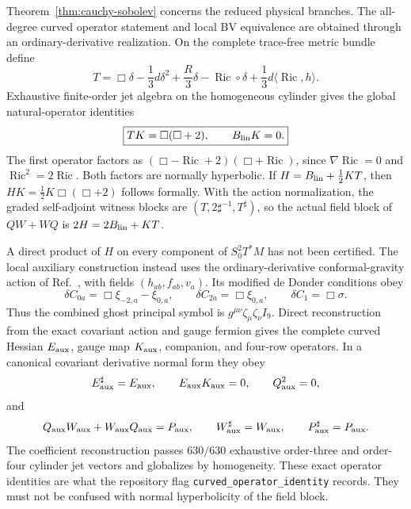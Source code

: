 \documentclass[11pt]{article}
\theoremstyle{definition}
\theoremstyle{remark}
\begin{document}
Theorem~\ref{thm:cauchy-sobolev} concerns the reduced physical branches.
The all-degree curved operator statement and local BV equivalence are obtained
through an ordinary-derivative realization.  On the complete trace-free metric bundle
define
\begin{equation}\label{eq:exact-gauge-companion}
 T=\Box\delta-\frac13d\delta^2+\frac R3\delta
 -\operatorname{Ric}\circ\delta
 +\frac13d\langle\operatorname{Ric},h\rangle .
\end{equation}
Exhaustive finite-order jet algebra on the homogeneous cylinder gives the
global natural-operator identities
\begin{equation}\label{eq:exact-ghost-biwave}
 \boxed{TK=\Box(\Box+2),\qquad B_{\rm lin}K=0.}
\end{equation}
The first operator factors as
$(\Box-\operatorname{Ric}+2)(\Box+\operatorname{Ric})$, since
$\nabla\operatorname{Ric}=0$ and $\operatorname{Ric}^2=2\operatorname{Ric}$.
Both factors are normally hyperbolic.  If
$H=B_{\rm lin}+\frac12KT$, then
$HK=\frac12K\Box(\Box+2)$ follows formally.  With the action normalization,
the graded self-adjoint witness blocks are
$(T,2\sharp^{-1},T^\sharp)$, so the actual field block of $QW+WQ$ is
$2H=2B_{\rm lin}+KT$.

A direct product of $H$ on every component of $S^2_0T^*M$ has not been
certified.  The local auxiliary construction instead uses the ordinary-derivative
conformal-gravity action of Ref.~\cite{MetsaevOrdinaryDerivative}, with
fields $(h_{ab},f_{ab},v_a)$.  Its modified de Donder conditions obey
\begin{equation}
 \delta C_{0a}=\Box\xi_{-2,a}-\xi_{0,a},\qquad
 \delta C_{2a}=\Box\xi_{0,a},\qquad
 \delta C_1=\Box\sigma .
\end{equation}
Thus the combined ghost principal symbol is
$g^{\mu\nu}\zeta_\mu\zeta_\nu I_9$.  Direct reconstruction from the exact
covariant action and gauge fermion gives the complete curved Hessian
$E_{\rm aux}$, gauge map $K_{\rm aux}$, companion, and four-row operators.
In a canonical covariant derivative normal form they obey
\begin{equation}
 E_{\rm aux}^{\sharp}=E_{\rm aux},\qquad
 E_{\rm aux}K_{\rm aux}=0,\qquad
 Q_{\rm aux}^2=0,
\end{equation}
and
\begin{equation}
 Q_{\rm aux}W_{\rm aux}+W_{\rm aux}Q_{\rm aux}=P_{\rm aux},
 \qquad W_{\rm aux}^{\sharp}=W_{\rm aux},
 \qquad P_{\rm aux}^{\sharp}=P_{\rm aux}.
\end{equation}
The coefficient reconstruction passes $630/630$ exhaustive order-three and
order-four cylinder jet vectors and globalizes by homogeneity.  These exact
operator identities are what the repository flag
\texttt{curved\_operator\_identity} records.  They must not be confused with
normal hyperbolicity of the field block.
\end{document}
